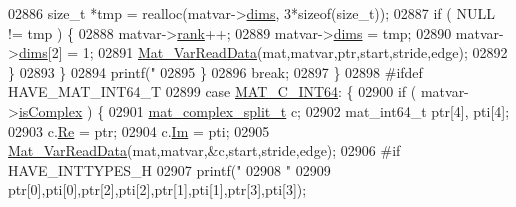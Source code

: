 \begin{DoxyCode}
{{{{{{{{{{{{{{{02886                             \textcolor{keywordtype}{size\_t} *tmp = realloc(matvar->\hyperlink{group___m_a_t_a8e01234e1c862ce3472bb37f5a09b92c}{dims}, 3*\textcolor{keyword}{sizeof}(\textcolor{keywordtype}{size\_t}));
02887                             \textcolor{keywordflow}{if} ( NULL != tmp ) \{
02888                                 matvar->\hyperlink{group___m_a_t_a84ba70c96ded13cc555fa75b768d9921}{rank}++;
02889                                 matvar->\hyperlink{group___m_a_t_a8e01234e1c862ce3472bb37f5a09b92c}{dims} = tmp;
02890                                 matvar->\hyperlink{group___m_a_t_a8e01234e1c862ce3472bb37f5a09b92c}{dims}[2] = 1;
02891                                 \hyperlink{group___m_a_t_ga1845000f4fc6252ec5ff11c4b9f0759f}{Mat\_VarReadData}(mat,matvar,ptr,start,stride,edge);
02892                             \}
02893                         \}
02894                         printf(\textcolor{stringliteral}{"%
02895                     \}
02896                     \textcolor{keywordflow}{break};
02897                 \}
02898 \textcolor{preprocessor}{#ifdef HAVE\_MAT\_INT64\_T}
02899                 \textcolor{keywordflow}{case} \hyperlink{group___m_a_t_ggad4d60ae7b709fc81bfd744fb4c857c40a1ea83bcde49b35477494412973f82409}{MAT\_C\_INT64}: \{
02900                     \textcolor{keywordflow}{if} ( matvar->\hyperlink{group___m_a_t_aeb03b3a69f108dc05470b00443a43739}{isComplex} ) \{
02901                         \hyperlink{group___m_a_t_structmat__complex__split__t}{mat\_complex\_split\_t} c;
02902                         mat\_int64\_t ptr[4], pti[4];
02903                         c.\hyperlink{group___m_a_t_a484a93607508adac2bce53a0252e0325}{Re} = ptr;
02904                         c.\hyperlink{group___m_a_t_a7182d10b0d3598415887376065440946}{Im} = pti;
02905                         \hyperlink{group___m_a_t_ga1845000f4fc6252ec5ff11c4b9f0759f}{Mat\_VarReadData}(mat,matvar,&c,start,stride,edge);
02906 \textcolor{preprocessor}{#if HAVE\_INTTYPES\_H}
02907                         printf(\textcolor{stringliteral}{"%
02908                             \textcolor{stringliteral}{"%
02909                             ptr[0],pti[0],ptr[2],pti[2],ptr[1],pti[1],ptr[3],pti[3]);
}}}}}}}}}}}}}}}}}}
\end{DoxyCode}
